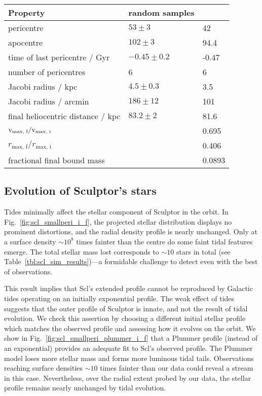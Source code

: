 \begin{table*}[t]
\centering
\caption[Simulation results for Sculptor’s dark matter]{The orbital and dark matter properties for the simulation of Sculptor. The random samples column shows the distributions from point orbits, and the \smallperi{} column contains the results from the N-body simulation. }
\label{tbl:scl_sim_results}
\begin{tabular}{lll}
\toprule
Property & random samples & \smallperi{}\\
\midrule
pericentre & $53\pm3$ & 42\\
apocentre & $102\pm3$ & 94.4\\
time of last pericentre / Gyr & $-0.45 \pm 0.2$ & -0.47\\
number of pericentres & 6 & 6\\
Jacobi radius / kpc & $4.5 \pm 0.3$ & 3.5\\
Jacobi radius / arcmin & $186\pm12$ & 101\\
final heliocentric distance / kpc & $83.2\pm2$ & 81.6\\
${\rm v}_\textrm{max, f} / {\rm v}_\textrm{max, i}$ &  & 0.695\\
$r_\textrm{max, f} / r_\textrm{max, i}$ &  & 0.406\\
fractional final bound mass &  & 0.0893\\
\bottomrule
\end{tabular}
\end{table*}

\subsection{Evolution of Sculptor's stars}\label{sec:scl_sim_stars}

Tides minimally affect the stellar component of Sculptor in the
\smallperi{} orbit. In Fig.~\ref{fig:scl_smallperi_i_f}, the projected
stellar distribution displays no prominent distortions, and the radial
density profile is nearly unchanged. Only at a surface density
\(\sim10^8\) times fainter than the centre do some faint tidal features
emerge. The total stellar mass lost corresponds to \(\sim 10\) stars in
total (see Table~\ref{tbl:scl_sim_results})---a formidable challenge to
detect even with the best of observations.

This result implies that Scl's extended profile cannot be reproduced by
Galactic tides operating on an initially exponential profile. The weak
effect of tides suggests that the outer profile of Sculptor is innate,
and not the result of tidal evolution. We check this assertion by
choosing a different initial stellar profile which matches the observed
profile and assessing how it evolves on the \smallperi{} orbit. We show
in Fig.~\ref{fig:scl_smallperi_plummer_i_f} that a Plummer profile
(instead of an exponential) provides an adequate fit to Scl's observed
profile. The Plummer model loses more stellar mass and forms more
luminous tidal tails. Observations reaching surface densities \(\sim10\)
times fainter than our data could reveal a stream in this case.
Nevertheless, over the radial extent probed by our data, the stellar
profile remains nearly unchanged by tidal evolution.

